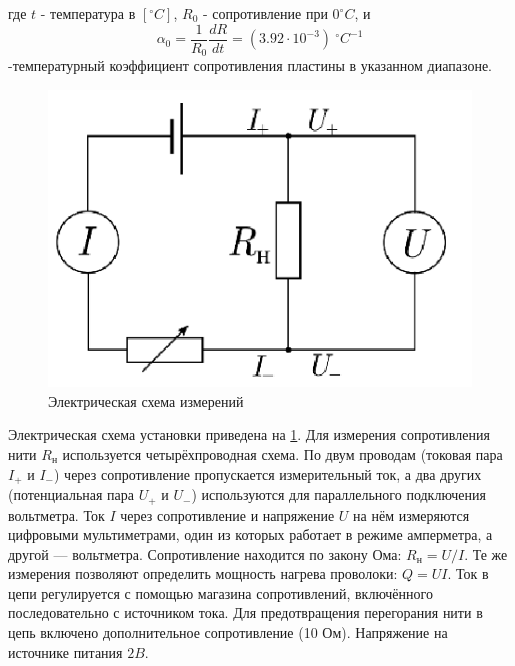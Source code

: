 \documentclass[12pt]{article}
\begin{document}
        где $t$ - температура в $[^{\circ} C]$, $R_0$ - сопротивление при $0 ^{\circ} C$, и
        \[
            \alpha_0 = \frac{1}{R_0}\frac{dR}{dt} = (3.92\cdot 10^{-3})\ ^{\circ} C^{-1}
        \]
        -температурный коэффициент сопротивления пластины в указанном диапазоне.
        \begin{figure}[H]
            \centering
            \includegraphics[width=0.4\linewidth]{electricity.png}
            \caption{Электрическая схема измерений}
            \label{electricity}
        \end{figure}
        Электрическая схема установки приведена на \ref{electricity}. Для измерения сопротивления нити $R_{\text{н}}$
        используется четырёхпроводная схема. По двум проводам (токовая пара $I_{+}$ и $I_{-}$) через сопротивление
        пропускается измерительный ток, а два других (потенциальная пара $U_{+}$ и $U_{-}$) используются
        для параллельного подключения вольтметра. Ток $I$ через сопротивление и напряжение $U$ на нём
        измеряются цифровыми мультиметрами, один из которых работает в режиме амперметра, а другой — вольтметра.
        Сопротивление находится по закону Ома: $R_{\text{н}} = U/I$. Те же измерения позволяют определить мощность
        нагрева проволоки: $Q = UI$. Ток в цепи регулируется с помощью магазина сопротивлений, включённого
        последовательно с источником тока. Для предотвращения перегорания нити в цепь включено дополнительное
        сопротивление (10 Ом). Напряжение на источнике питания $2 B$.
\end{document}
